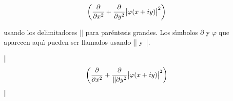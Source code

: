 

\bigskip


$$ \biggl({\partial \over \partial x^2} + {\partial \over 
\partial y^2}\bigl\vert\varphi(x + iy)\bigr\vert^2\biggr)$$


\noindent usando los delimitadores |\bigg| para par\'entesis
grandes. Los s\'{\i}mbolos $\partial$ y $\varphi$ que aparecen
aqu\'{\i} pueden ser llamados usando |\partial| y |\varphi|.

\bigskip 

\respuestaS

|$$ \biggl({\partial \over \partial x^2} + {\partial \over |

|\partial y^2}\bigl\vert\varphi(x + iy)\bigr\vert^2\biggr)$$|

\bye

